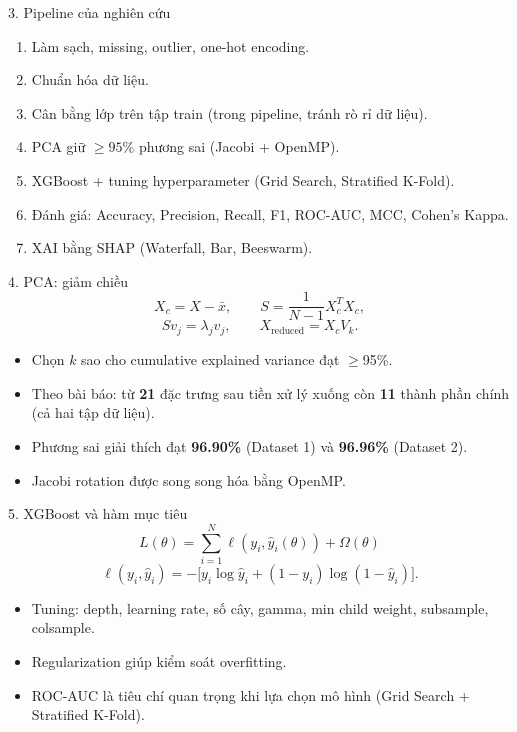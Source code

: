 \documentclass[aspectratio=169,11pt]{beamer}
\begin{document}
\begin{frame}{3. Pipeline của nghiên cứu}
\centering
\begin{minipage}{0.84\linewidth}
\begin{enumerate}
  \item Làm sạch, missing, outlier, one-hot encoding.
  \item Chuẩn hóa dữ liệu.
  \item Cân bằng lớp trên tập train (trong pipeline, tránh rò rỉ dữ liệu).
  \item PCA giữ $\ge 95\%$ phương sai (Jacobi + OpenMP).
  \item XGBoost + tuning hyperparameter (Grid Search, Stratified K-Fold).
  \item Đánh giá: Accuracy, Precision, Recall, F1, ROC-AUC, MCC, Cohen's Kappa.
  \item XAI bằng SHAP (Waterfall, Bar, Beeswarm).
\end{enumerate}
\end{minipage}
\end{frame}

\begin{frame}{4. PCA: giảm chiều}
\[
X_c=X-\bar{x},\qquad
S=\frac{1}{N-1}X_c^TX_c,
\]
\[
Sv_j=\lambda_jv_j,\qquad X_{\text{reduced}}=X_cV_k.
\]
\begin{itemize}
  \item Chọn $k$ sao cho cumulative explained variance đạt $\ge$95\%.
  \item Theo bài báo: từ \textbf{21} đặc trưng sau tiền xử lý xuống còn \textbf{11} thành phần chính (cả hai tập dữ liệu).
  \item Phương sai giải thích đạt \textbf{96.90\%} (Dataset 1) và \textbf{96.96\%} (Dataset 2).
  \item Jacobi rotation được song song hóa bằng OpenMP.
\end{itemize}
\end{frame}

\begin{frame}{5. XGBoost và hàm mục tiêu}
\[
L(\theta)=\sum_{i=1}^{N}\ell(y_i,\hat y_i(\theta))+\Omega(\theta)
\]
\[
\ell(y_i,\hat y_i)=-\big[y_i\log\hat y_i+(1-y_i)\log(1-\hat y_i)\big].
\]
\begin{itemize}
  \item Tuning: depth, learning rate, số cây, gamma, min child weight, subsample, colsample.
  \item Regularization giúp kiểm soát overfitting.
  \item ROC-AUC là tiêu chí quan trọng khi lựa chọn mô hình (Grid Search + Stratified K-Fold).
\end{itemize}
\end{frame}
\end{document}
